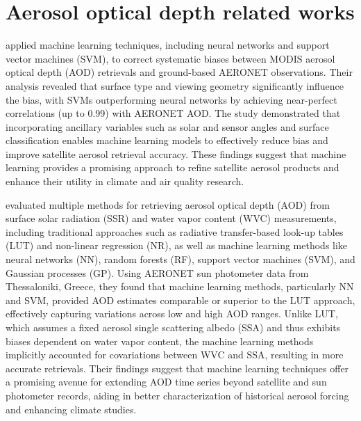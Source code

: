 \documentclass[11pt]{article}
\begin{document}
\section{Aerosol optical depth related works}
\citet{lary2009machine} applied machine learning techniques, including neural networks and support vector machines (SVM), to correct systematic biases between MODIS aerosol optical depth (AOD) retrievals and ground-based AERONET observations. Their analysis revealed that surface type and viewing geometry significantly influence the bias, with SVMs outperforming neural networks by achieving near-perfect correlations (up to 0.99) with AERONET AOD. The study demonstrated that incorporating ancillary variables such as solar and sensor angles and surface classification enables machine learning models to effectively reduce bias and improve satellite aerosol retrieval accuracy. These findings suggest that machine learning provides a promising approach to refine satellite aerosol products and enhance their utility in climate and air quality research.

\citet{huttunen2016retrieval} evaluated multiple methods for retrieving aerosol optical depth (AOD) from surface solar radiation (SSR) and water vapor content (WVC) measurements, including traditional approaches such as radiative transfer-based look-up tables (LUT) and non-linear regression (NR), as well as machine learning methods like neural networks (NN), random forests (RF), support vector machines (SVM), and Gaussian processes (GP). Using AERONET sun photometer data from Thessaloniki, Greece, they found that machine learning methods, particularly NN and SVM, provided AOD estimates comparable or superior to the LUT approach, effectively capturing variations across low and high AOD ranges. Unlike LUT, which assumes a fixed aerosol single scattering albedo (SSA) and thus exhibits biases dependent on water vapor content, the machine learning methods implicitly accounted for covariations between WVC and SSA, resulting in more accurate retrievals. Their findings suggest that machine learning techniques offer a promising avenue for extending AOD time series beyond satellite and sun photometer records, aiding in better characterization of historical aerosol forcing and enhancing climate studies.
\end{document}
